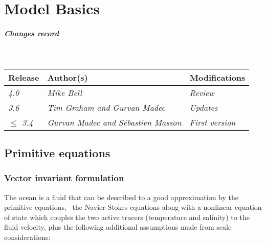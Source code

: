 \documentclass[../main/NEMO_manual]{subfiles}
\begin{document}
\chapter{Model Basics}
\label{chap:MB}

\chaptertoc

\paragraph{Changes record} ~\\

{\footnotesize
  \begin{tabular}{l||l|l}
    Release          & Author(s)                                   & Modifications       \\
    \hline
    {\em        4.0} & {\em Mike Bell                            } & {\em Review       } \\
    {\em        3.6} & {\em Tim Graham and Gurvan Madec          } & {\em Updates      } \\
    {\em $\leq$ 3.4} & {\em Gurvan Madec and S\'{e}bastien Masson} & {\em First version} \\
  \end{tabular}
}

\clearpage

\section{Primitive equations}
\label{sec:MB_PE}

\subsection{Vector invariant formulation}
\label{subsec:MB_PE_vector}

The ocean is a fluid that can be described to a good approximation by the primitive equations,
\ie\ the Navier-Stokes equations along with a nonlinear equation of state which
couples the two active tracers (temperature and salinity) to the fluid velocity,
plus the following additional assumptions made from scale considerations:
\end{document}
